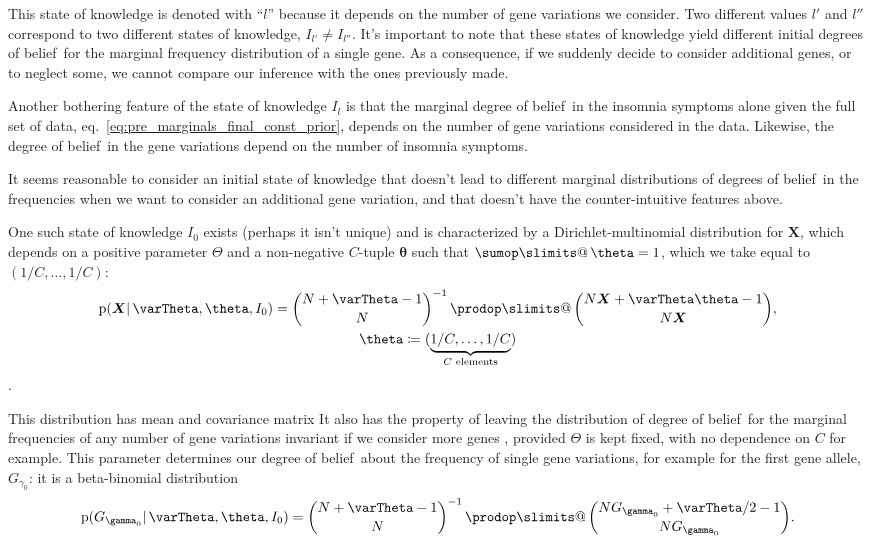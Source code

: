 \documentclass[\ifafour a4paper,12pt,\else a5paper,10pt,\fi%
onecolumn,oneside,article,%
british%
]{memoir}
\makeatletter
\theoremstyle{remark}
\theoremstyle{innote}
\def\sum{\DOTSI\sumop\slimits@}
\def\prod{\DOTSI\prodop\slimits@}
\newcommand*{\citep}{\parencites}
\newcommand*{\defd}{\coloneqq}
\newcommand*{\pf}{\mathrm{p}}%
\renewcommand*{\|}{\mathpunct{|}}
\newcommand*{\sect}{\S}%
\newcommand*{\sects}{\S\S}%
\newcommand*{\eqn}{eq.}%
\newcommand*{\tprod}{\mathop{\textstyle\prod}\nolimits}
\newcommand*{\tsum}{\mathop{\textstyle\sum}\nolimits}
\newcommand*{\E}{\mathrm{E}}
\DeclareMathOperator{\cov}{cov}
\DeclareMathOperator{\diag}{diag}
\newcommand*{\dob}{degree of belief}
\newcommand*{\dobs}{degrees of belief}
\newcommand*{\yI}{I}
\newcommand*{\ysum}{\tsum}
\newcommand*{\yprod}{\tprod}
\newcommand*{\yg}{\gamma}
\newcommand*{\gn}{l}
\newcommand*{\yF}{\bm{X}}
\newcommand*{\yIc}{I_{\gn}}
\newcommand*{\yIo}{I_{0}}
\newcommand*{\yA}{\varTheta}
\newcommand*{\ya}{\bm{\theta}}
\makeatother
\begin{document}
This state of knowledge is denoted with \enquote{$\gn$} because it depends
on the number of gene variations we consider. Two different values $\gn'$
and $\gn''$ correspond to two different states of knowledge,
$\yI_{\gn'} \ne \yI_{\gn''}$. It's important to note that these states of
knowledge yield different initial \dobs\ for the marginal frequency
distribution of a single gene. As a consequence, if we suddenly decide to
consider additional genes, or to neglect some, we cannot compare our
inference with the ones previously made.

Another bothering feature of the state of knowledge $\yIc$ is that the
marginal \dob\ in the insomnia symptoms alone given the full set of
data, \eqn~\eqref{eq:pre_marginals_final_const_prior}, depends on the number of
gene variations considered in the data. Likewise, the \dob\ in the
gene variations depend on the number of insomnia symptoms.

It seems reasonable to consider an initial state of knowledge that doesn't
lead to different marginal distributions of \dobs\ in the frequencies when
we want to consider an additional gene variation, and that doesn't have
the counter-intuitive features above.

One such state of knowledge $\yIo$ exists (perhaps it isn't unique) and is
characterized by a Dirichlet-multinomial distribution for $\yF$, which
depends on a positive parameter $\yA$ and a non-negative $C$-tuple $\ya$
such that $\ysum\ya=1$, which we take equal to $(1/C,\dotsc,1/C)$:
\begin{multline}
  \label{eq:pre_dirichlet_prior}
  \pf(\yF \| \yA, \ya,\yIo) =
  \binom{N+\yA-1}{N}^{-1} \yprod\binom{N\yF+\yA\ya-1}{N\yF},\\
  \ya \defd (\underbrace{1/C,\dotsc,1/C}_{\text{$C$ elements}})
\end{multline}
\citep[\sect~13.1]{johnsonetal1969_r1996}[\sect~3]{minka2000_r2012}[and
especially][\sects~3--4]{basuetal1982}.

This distribution has mean and covariance matrix
It also has the property of leaving the distribution of \dob\ for the
marginal frequencies of any number of gene variations invariant if we
consider more genes \citep[\sects~3--4]{basuetal1982}, provided $\yA$ is
kept fixed, with no dependence on $C$ for example. This parameter
determines our \dob\ about the frequency of single gene variations, for
example for the first gene allele, $G_{\yg_0}$: it is a beta-binomial
distribution
\begin{equation}
  \label{eq:pre_dirichlet_prior_marginal_beta-binomial}
  \pf(G_{\yg_0} \| \yA, \ya,\yIo) =
  \binom{N+\yA-1}{N}^{-1} \yprod\binom{N G_{\yg_0}+\yA/2-1}{N G_{\yg_0}}.
\end{equation}
\end{document}
